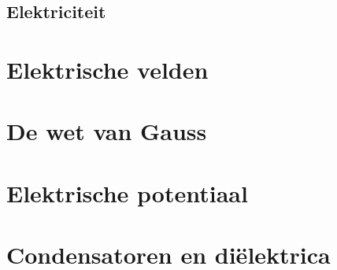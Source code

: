 \documentclass{exam}
\begin{document}

% 


\vspace*{\fill}
\begin{center}
    
\section*{Elektriciteit}
\end{center}

\vspace*{\fill}

\newpage

\section{Elektrische velden}

\vspace{0.5cm}



\newpage

\section{De wet van Gauss}

\vspace{0.5cm}



\newpage

\section{Elektrische potentiaal}

\vspace{0.5cm}



\newpage

\section{Condensatoren en diëlektrica}

\vspace{0.5cm}


\end{document}
